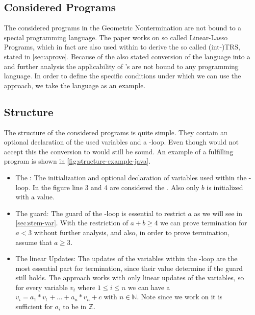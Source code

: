 \subsection{Considered Programs}
The considered programs in the Geometric Nontermination are not bound to a special programming language. The paper works on so called Linear-Lasso Programs, which in fact are also used within \aprove to derive the so called (int-)TRS, stated in \autoref{sec:aprove}. Because of the also stated conversion of the language into a \seg and further analysis the applicability of \gna's are not bound to any programming language. \newline
In order to define the specific conditions under which we can use the approach, we take the language  as an example.
\subsection{Structure}
\label{sec:structure}
The structure of the considered programs is quite simple. They contain an optional declaration of the used variables and a -loop. Even though  would not accept this the conversion to  would still be sound. An example of a fulfilling  program is shown in \autoref{fig:structure-example-java}. 
\begin{itemize}
	\item The \stem: \newline
		The initialization and optional declaration of variables used within the -loop. In the figure line 3 and 4 are considered the \stem. Also only $b$ is initialized with a value.
	\item The guard: \newline
		The guard of the -loop is essential to restrict $a$  as we will see in \autoref{sec:stem-var}. With the restriction of $a+b\ge 4 $ we can prove termination for $a < 3$ without further analysis, and also, in order to prove termination, assume that $a \ge 3$.
	\item The linear Updates: \newline
		The updates of the variables within the -loop are the most essential part for termination, since their value determine if the guard still holds. The approach works with only linear updates of the variables, so for every variable $v_i$ where $1\le i\le n$ we can have a $v_i=a_1*v_1+...+a_n*v_n+c$ with $n \in \mathbb{N}$. Note since we work on \its it is sufficient for $a_i$ to be in $\mathbb{Z}$. 	
\end{itemize} 

